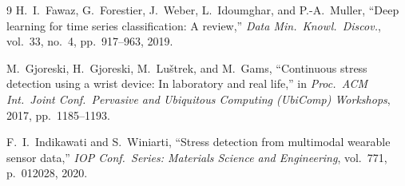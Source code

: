\documentclass[11pt]{article}
\begin{document}
\begin{thebibliography}{9}
H.~I.~Fawaz, G.~Forestier, J.~Weber, L.~Idoumghar, and P.-A.~Muller,
``Deep learning for time series classification: A review,''
\textit{Data Min.\ Knowl.\ Discov.}, vol.~33, no.~4, pp.~917--963, 2019.

M.~Gjoreski, H.~Gjoreski, M.~Lu\v{s}trek, and M.~Gams,
``Continuous stress detection using a wrist device: In laboratory and real life,''
in \textit{Proc.\ ACM Int.\ Joint Conf.\ Pervasive and Ubiquitous Computing (UbiComp) Workshops}, 2017, pp.~1185--1193.

F.~I.~Indikawati and S.~Winiarti,
``Stress detection from multimodal wearable sensor data,''
\textit{IOP Conf.\ Series: Materials Science and Engineering}, vol.~771, p.~012028, 2020.

\end{thebibliography}
\end{document}
